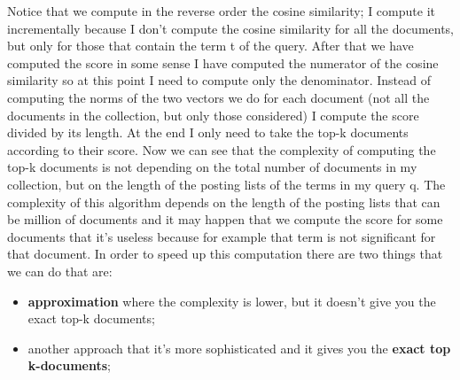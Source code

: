Notice that we compute in the reverse order the cosine similarity; I compute it incrementally because I don't compute the cosine similarity for all the documents, but only for those that contain the term t of the query.\newline
After that we have computed the score in some sense I have computed the numerator of the cosine similarity so at this point I need to compute only the denominator. Instead of computing the norms of the two vectors we do for each document (not all the documents in the collection, but only those considered) I compute the score divided by its length. At the end I only need to take the top-k documents according to their score.\newline
Now we can see that the complexity of computing the top-k documents is not depending on the total number of documents in my collection, but on the length of the posting lists of the terms in my query q. The complexity of this algorithm depends on the length of the posting lists that can be million of documents and it may happen that we compute the score for some documents that it's useless because for example that term is not significant for that document.\newline
In order to speed up this computation there are two things that we can do that are:
\begin{itemize}
    \item \textbf{approximation} where the complexity is lower, but it doesn't give you the exact top-k documents;
    \item another approach that it's more sophisticated and it gives you the \textbf{exact top k-documents};
\end{itemize}
